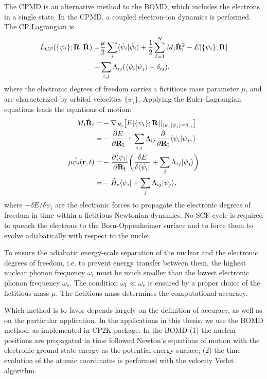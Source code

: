 The CPMD is an alternative method to the BOMD, which includes the 
electrons in a single state\cite{CP}. In the CPMD, a coupled electron-ion dynamics is performed.
The CP Lagrangian is 
\begin{align}
L_{\text{CP}} (\{\psi_i\}; {\bf R},\dot{{\bf R}}) =& \frac{\mu}{2}\sum_i\langle\dot{\psi}_i|\dot{\psi}_i\rangle +  \frac{1}{2}\sum^N_{I=1}M_{\text{I}}\dot{\bf R}^2_{\text{I}}  - E[\{\psi_i\};{\bf R}] \nonumber \\
   +& \sum_{i,j}\Lambda_{ij}(\langle\psi_i|\psi_j\rangle -\delta_{ij} ),
\label{eq:L_CP}
\end{align}
where the electronic degrees of freedom carries a fictitious mass parameter $\mu$, and are characterized by orbital velocities 
$\{\dot{\psi}_i\}$.  Applying the Euler-Lagrangian equations leads the equations of motion:
\begin{align}
  M_{\text{I}}\ddot{\bf R}_{\text{I}} =& -\nabla_{R_{\text{I}}} \bigl[E[\{\psi_i\};{\bf R}]|_{\langle\psi_i|\psi_j\rangle=\delta_{ij} }\bigr]\nonumber \\
  =&-\frac{\partial E}{\partial {\bf R}_{\text{I}}}  + \sum_{i,j}\Lambda_{ij}\frac{\partial}{\partial {\bf R}_{\text{I}}}\langle\psi_i|\psi_j, \rangle\\ 
  \mu\ddot{\psi}_i({\bf r},t) =& -\frac{\partial \langle\psi_i|}{\partial {\bf R}_{\text{I}}}\biggl(\frac{\delta E}{\delta\langle\psi_i|} + \sum_j \Lambda_{ij}|\psi_j\rangle\biggr)\nonumber \\
  =& -\hat{H}_{\text{e}}\langle\psi_i| + \sum_j \Lambda_{ij}|\psi_j\rangle,
\label{eq:LEE_CP}
\end{align}
where $-\delta E/\delta\psi_i$ are the electronic forces to propagate the electronic degrees of freedom in time 
within a fictitious Newtonian dynamics.  No SCF cycle is required to quench the electrons to the Born-Oppenheimer surface and 
to force them to evolve adiabatically with respect to the nuclei.

To ensure the adiabatic energy-scale separation of the nuclear and the electronic degrees of freedom, i.e. 
to prevent energy transfer between them, the highest nuclear phonon frequency  $\omega_{\text{I}}$ must be 
much smaller than the lowest electronic phonon frequency $\omega_{\text{e}}$. The condition $\omega_{\text{I}} \ll \omega_{\text{e}}$ 
is ensured by a proper choice of the fictitious mass $\mu$. The fictitious mass determines the computational accuracy.  

Which method is to favor depends largely on the definition of accuracy, as well as on the particular application.
In the applications in this thesis, we use the BOMD method, as implemented in CP2K package\cite{CP2K,Kuehne2020}. 
In the BOMD  
(1) the nuclear positions are propagated in time followed Newton's equations of motion with the electronic ground state energy as the potential energy surface; 
(2) the time evolution of the atomic coordinates is performed with the velocity Verlet algorithm\cite{FS2002}.


